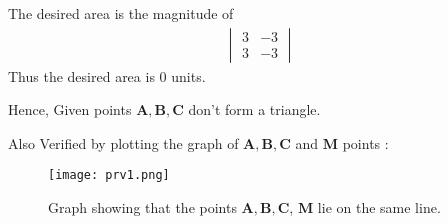 \documentclass[journal,12pt,twocolumn]{IEEEtran}
\let\vec\mathbf
\newcommand{\mydet}[1]{\ensuremath{\begin{vmatrix}#1\end{vmatrix}}}
\begin{document}
	The desired area is  the magnitude of 
    \begin{align}
     \mydet{3 & -3\\3 & -3} 
    \end{align}
    Thus the desired area is 0 units.
	
    \large Hence, Given points $\vec{A}, \vec{B}, \vec{C}$ don't form a triangle.

    \large Also Verified by plotting the graph of $\vec{A}, \vec{B}, \vec{C}$ and $\vec{M}$ points :

  	\begin{figure}[!ht]
		\centering
		\texttt{[image: prv1.png]}
		\caption{\large Graph showing that the points  $\vec{A}, \vec{B}, \vec{C}$, $\vec{M}$ lie on the same line.}
	\end{figure}
	
\end{document}

